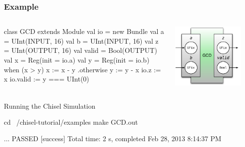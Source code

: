 \documentclass[xcolor=pdflatex,dvipsnames,table]{beamer}
\begin{document}
\begin{frame}[fragile]
\frametitle{Example}
\begin{columns}


\begin{footnotesize}
\begin{scala}
class GCD extends Module {
  val io = new Bundle {
    val a     = UInt(INPUT, 16)
    val b     = UInt(INPUT, 16)
    val z     = UInt(OUTPUT, 16)
    val valid = Bool(OUTPUT) }
  val x = Reg(init = io.a)
  val y = Reg(init = io.b)
  when (x > y) {
    x := x - y
  } .otherwise {
    y := y - x
  }
  io.z     := x
  io.valid := y === UInt(0)
}
\end{scala}
\end{footnotesize}


\begin{center}
\includegraphics[width=0.9\textwidth]{figs/gcd.pdf} 
\end{center}

\end{columns}
\end{frame}

\begin{frame}[fragile]{Running the Chisel Simulation}

\begin{bash}
cd ~/chisel-tutorial/examples
make GCD.out
\end{bash}

{
\begin{bash}
...
PASSED
[success] Total time: 2 s, completed Feb 28, 2013 8:14:37 PM
\end{bash}
}

\end{frame}
\end{document}
